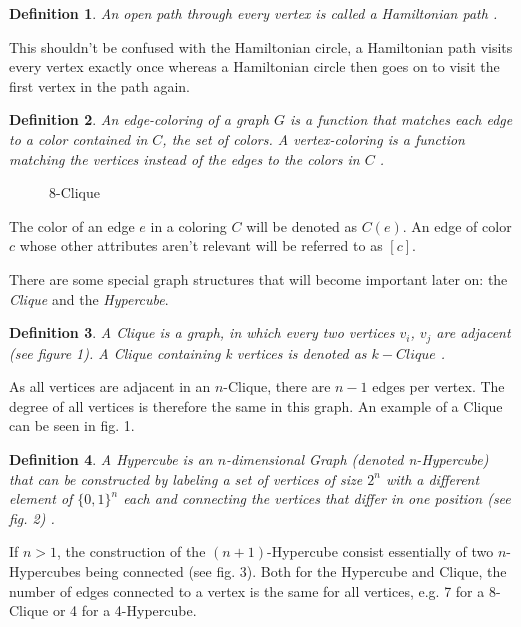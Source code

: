 \documentclass[12pt,a4paper]{article}
\newtheorem{definition}{Definition}
\begin{document}
\begin{definition}An open path through every vertex is called a Hamiltonian path \citep[p. 14]{Bollobas1998}.
\end{definition}
This shouldn't be confused with the Hamiltonian circle, a Hamiltonian path visits every vertex exactly once whereas a Hamiltonian circle then goes on to visit the first vertex in the path again.
\begin{definition}
An edge-coloring of a graph $G$ is a function that matches each edge to a color contained in $C$, the set of colors.  A vertex-coloring is a function matching the vertices instead of the edges to the colors in $C$ \citep[pp. 7-8]{Gross2013}. 
\end{definition} 
\begin{wrapfigure}{r}{4cm}
	
	\caption{8-Clique}
\end{wrapfigure}
The color of an edge $e$ in a coloring $C$ will be denoted as $C(e)$. An edge of color $c$ whose other attributes aren't relevant will be referred to as $[c]$.
\newline

\par There are some special graph structures that will become important later on: the \textit{Clique} and the \textit{Hypercube}. 
\begin{definition}
A Clique is a graph, in which every two vertices $v_i$, $v_j$ are adjacent (see figure 1).  A Clique containing k vertices is denoted as $k-Clique$ \citep[pp. 21, 111]{Gross2013}.
\end{definition}

As all vertices are adjacent in an $n$-Clique, there are $n-1$ edges per vertex. The degree of all vertices is therefore the same in this graph. An example of a Clique can be seen in fig. 1.
\newpage
\begin{definition}
A Hypercube is an $n$-dimensional Graph (denoted n-Hypercube) that can be constructed by labeling a set of vertices of size $2^n$ with a different element of $\{ 0, 1 \}^n$ each and connecting the vertices that differ in one position (see fig. 2) \citep[p. 60]{Bollobas1998}.
\end{definition}
If $n > 1$, the construction of the $(n+1)$-Hypercube consist essentially of two $n$-Hypercubes being connected (see fig. 3). Both for the Hypercube and Clique, the number of edges connected to a vertex is the same for all vertices, e.g. 7 for a 8-Clique or 4 for a 4-Hypercube.
\newline
\end{document}
